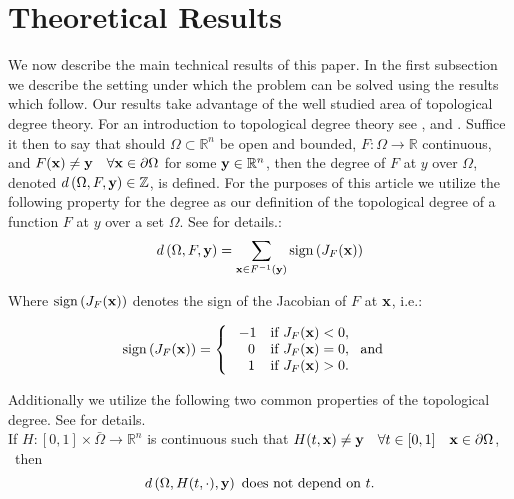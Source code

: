 \section{Theoretical Results} \label{sec:theory}  

We now describe the main technical results of this paper. 
In the first subsection we describe the setting under which the problem can be solved using the results which follow. Our results take advantage of the well studied area of topological degree theory. 
For an introduction to topological degree theory see \cite{OrChCh2006}, \cite{fonseca1995degree} and \cite{MoVrYa2002}. 
Suffice it then to say that should $\Omega\subset\mathbb{R}^{n}$ be open and bounded, $F:\Omega\rightarrow \mathbb{R}$ continuous, and $F(\bold x)\neq \bold y \quad \forall \bold x\in\partial\Omega$ for some $\bold y\in\mathbb{R}^n$, then the degree of $F$ at $y$ over $\Omega$, denoted $d\left(\Omega,F,\bold y\right)\in\mathbb{Z}$, is defined. 
For the purposes of this article we utilize the following property for the degree as our definition of the topological degree of a function $F$ at $y$ over a set $\Omega$. 
See \cite{OrChCh2006} for details.:
\begin{equation}\label{eq:Deg3}
d\left(\Omega,F,\bold y\right)=\sum\limits_{\bold x\in F^{-1}(\bold y)}\operatorname{sign}\left(J_F(\bold x)\right)
\end{equation}

Where $\operatorname{sign}\left(J_F(\bold x)\right)$ denotes the sign of the Jacobian of $F$ at $\bold x$, i.e.:

\[\operatorname{sign}\left(J_F(\bold x)\right)=   \left\{
\begin{array}{ll}
       \ -1   & \mbox{if } J_F(\bold x)< 0, \\
      \quad 0 & \mbox{if } J_F(\bold x)= 0,~\mbox{ and } \\
      \quad 1 & \mbox{if } J_F(\bold x)> 0. \\
\end{array} 
\right. \]

Additionally we utilize the following two common properties of the topological degree. 
See \cite{OrChCh2006} for details. \\
If $H : [0,1]\times\bar{\Omega}\rightarrow\mathbb{R}^n$ is continuous such that $H(t,\bold x)\neq \bold y \quad \forall t\in[0,1]\quad \bold x\in\partial\Omega$,   \ then 
\begin{equation}\label{eq:Deg1} 
d\left(\Omega,H(t,\cdot),\bold y\right)\text{ does not depend on }t.
\end{equation}


